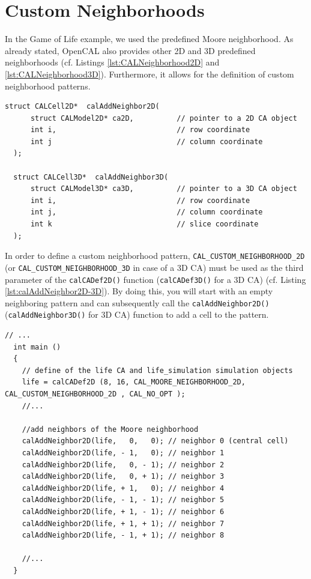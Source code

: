 \section{Custom Neighborhoods}\label{sec:CustomNeiughbourhoods}
In the Game of Life example, we used the predefined Moore
neighborhood. As already stated, OpenCAL also provides other 2D and 3D
predefined neighborhoods (cf. Listings \ref{lst:CALNeighborhood2D} and
\ref{lst:CALNeighborhood3D}). Furthermore, it allows for the
definition of custom neighborhood patterns.


\begin{lstlisting}[float,floatplacement=H, label=lst:calAddNeighbor2D-3D, caption=The calAddNeighbor2D() and calAddNeighbor3D() functions to define custom neighborhood patterns., numbers=none]
  struct CALCell2D*  calAddNeighbor2D(
      struct CALModel2D* ca2D,          // pointer to a 2D CA object
      int i,                            // row coordinate
      int j                             // column coordinate
  );

  struct CALCell3D*  calAddNeighbor3D(
      struct CALModel3D* ca3D,          // pointer to a 3D CA object
      int i,                            // row coordinate
      int j,                            // column coordinate
      int k                             // slice coordinate
  );
\end{lstlisting}


In order to define a custom neighborhood pattern,
\verb'CAL_CUSTOM_NEIGHBORHOOD_2D' (or
\verb'CAL_CUSTOM_NEIGHBORHOOD_3D' in case of a 3D CA) must be used as
the third parameter of the \verb'calCADef2D()' function
(\verb'calCADef3D()' for a 3D CA) (cf. Listing
\ref{lst:calAddNeighbor2D-3D}). By doing this, you will start with an
empty neighboring pattern and can subsequently call the
\verb'calAddNeighbor2D()' (\verb'calAddNeighbor3D()' for 3D CA)
function to add a cell to the pattern.

\begin{lstlisting}[float,floatplacement=H, label=lst:CustomMooreExample, caption=Example of custom neighbourhood pattern; the sequence of calls to the calAddNeighbor2D() function defines the Moore neighbourhood for the Game of Life CA., numbers=none]
  // ...
  int main ()
  {
    // define of the life CA and life_simulation simulation objects
    life = calCADef2D (8, 16, CAL_MOORE_NEIGHBORHOOD_2D, CAL_CUSTOM_NEIGHBORHOOD_2D , CAL_NO_OPT );
    //...

    //add neighbors of the Moore neighborhood
    calAddNeighbor2D(life,   0,   0); // neighbor 0 (central cell)
    calAddNeighbor2D(life, - 1,   0); // neighbor 1
    calAddNeighbor2D(life,   0, - 1); // neighbor 2
    calAddNeighbor2D(life,   0, + 1); // neighbor 3
    calAddNeighbor2D(life, + 1,   0); // neighbor 4
    calAddNeighbor2D(life, - 1, - 1); // neighbor 5
    calAddNeighbor2D(life, + 1, - 1); // neighbor 6
    calAddNeighbor2D(life, + 1, + 1); // neighbor 7
    calAddNeighbor2D(life, - 1, + 1); // neighbor 8

    //...
  }
\end{lstlisting}

